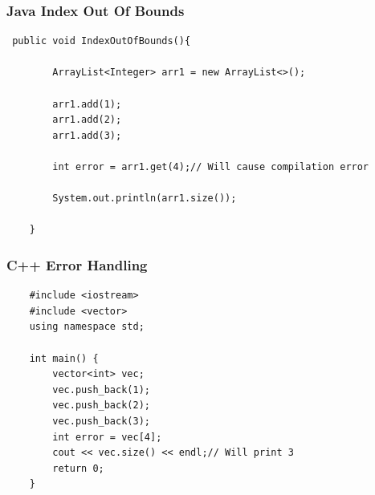 \documentclass[10pt]{article}  %
\theoremstyle{definition}
\theoremstyle{remark}
\begin{document}
\begin{appendices}
\subsubsection{Java Index Out Of Bounds}\label{job} 
\begin{lstlisting}
 public void IndexOutOfBounds(){

        ArrayList<Integer> arr1 = new ArrayList<>();

        arr1.add(1);
        arr1.add(2);
        arr1.add(3);

        int error = arr1.get(4);// Will cause compilation error

        System.out.println(arr1.size());

    }
\end{lstlisting} 

\subsubsection{C++ Error Handling}\label{cob}
\begin{lstlisting}
    #include <iostream>
    #include <vector>
    using namespace std;
     
    int main() {
    	vector<int> vec; 
    	vec.push_back(1);
    	vec.push_back(2);
    	vec.push_back(3);
    	int error = vec[4];
    	cout << vec.size() << endl;// Will print 3
       	return 0;
    }
\end{lstlisting} 

 
 
\end{appendices}
\end{document}
